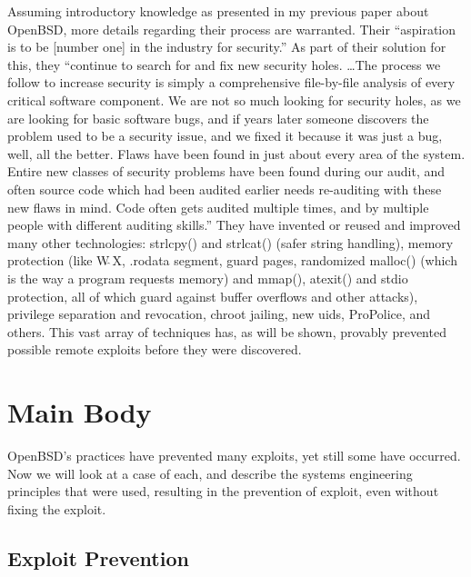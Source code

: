\documentclass[12pt]{article}
\begin{document}
{Assuming introductory knowledge as presented in my previous paper about OpenBSD, more details regarding their process are warranted. Their ``aspiration is to be [number one] in the industry for security.'' As part of their solution for this, they ``continue to search for and fix new security holes. \ldots The process we follow to increase security is simply a comprehensive file-by-file analysis of every critical software component. We are not so much looking for security holes, as we are looking for basic software bugs, and if years later someone discovers the problem used to be a security issue, and we fixed it because it was just a bug, well, all the better. Flaws have been found in just about every area of the system. Entire new classes of security problems have been found during our audit, and often source code which had been audited earlier needs re-auditing with these new flaws in mind. Code often gets audited multiple times, and by multiple people with different auditing skills.'' They have invented or reused and improved many other technologies: strlcpy() and strlcat() (safer string handling), memory protection (like W$\widehat{\ }$X, .rodata segment, guard pages, randomized malloc() (which is the way a program requests memory) and mmap(), atexit() and stdio protection, all of which guard against buffer overflows and other attacks), privilege separation and revocation, chroot jailing, new uids, ProPolice, and others. This vast array of techniques has, as will be shown, provably prevented possible remote exploits before they were discovered. \cite{openbsd-security}

\section*{Main Body}

OpenBSD's practices have prevented many exploits, yet still some have occurred. Now we will look at a case of each, and describe the systems engineering principles that were used, resulting in the prevention of exploit, even without fixing the exploit.

\subsection*{Exploit Prevention}

}
\end{document}
